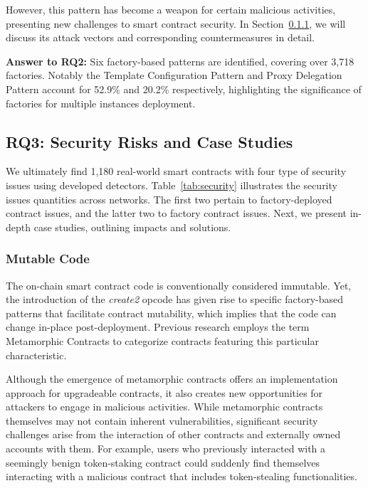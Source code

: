 \documentclass[acmsmall,screen]{acmart}
\begin{document}
	However, this pattern has become a weapon for certain malicious activities, presenting new challenges to smart contract security. In Section~\ref{sec:security-mutablecode}, we will discuss its attack vectors and corresponding countermeasures in detail.
	\begin{answerbox}
		\textbf{Answer to RQ2:} Six factory-based patterns are identified, covering over 3,718 factories. Notably the Template Configuration Pattern and Proxy Delegation Pattern account for 52.9\% and 20.2\% respectively, highlighting the significance of factories for multiple instances deployment.
	\end{answerbox}

	\subsection{RQ3: Security Risks and Case Studies}\label{sec:rq4securityrisks}

	

	We ultimately find 1,180 real-world smart contracts with four type of security issues using developed detectors. Table~\ref{tab:security} illustrates the security issues quantities across networks. The first two pertain to factory-deployed contract issues, and the latter two to factory contract issues. Next, we present in-depth case studies, outlining impacts and solutions.

	\subsubsection{Mutable Code}\label{sec:security-mutablecode}
	The on-chain smart contract code is conventionally considered immutable. Yet, the introduction of the \textit{create2} opcode has given rise to specific factory-based patterns that facilitate contract mutability, which implies that the code can change in-place post-deployment. Previous research employs the term Metamorphic Contracts \cite{DBLP:conf/fc/FrowisB22} to categorize contracts featuring this particular characteristic.

	Although the emergence of metamorphic contracts offers an implementation approach for upgradeable contracts, it also creates new opportunities for attackers to engage in malicious activities. While metamorphic contracts themselves may not contain inherent vulnerabilities, significant security challenges arise from the interaction of other contracts and externally owned accounts with them. For example, users who previously interacted with a seemingly benign token-staking contract could suddenly find themselves interacting with a malicious contract that includes token-stealing functionalities.
\end{document}
